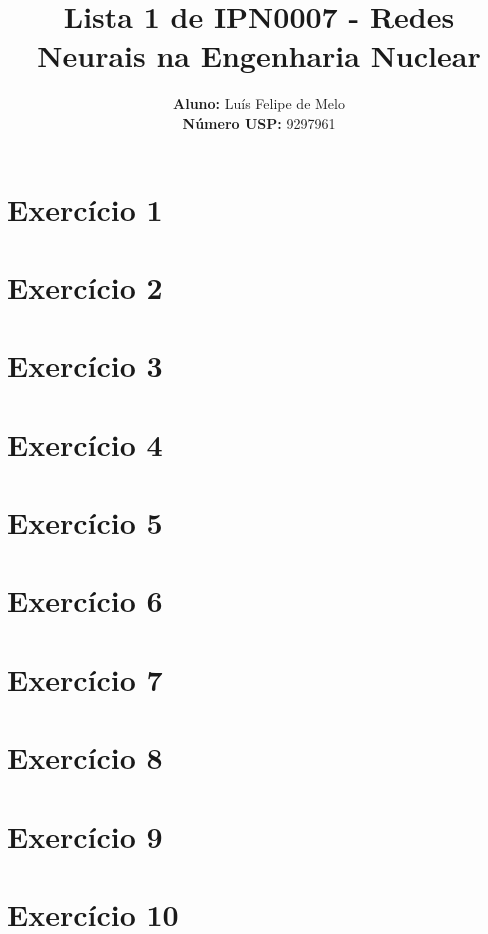 \documentclass{article}
\title{\textbf{Lista 1 de IPN0007 - Redes Neurais na Engenharia Nuclear}}
\author{
    \textbf{Aluno:} Luís Felipe de Melo  \\
    \textbf{Número USP:} 9297961
    }
\date{}
\begin{document}
\maketitle

\section*{Exercício 1}
\section*{Exercício 2}
\section*{Exercício 3}
\section*{Exercício 4}
\section*{Exercício 5}
\section*{Exercício 6}
\section*{Exercício 7}
\section*{Exercício 8}
\section*{Exercício 9}
\section*{Exercício 10}
\end{document}
